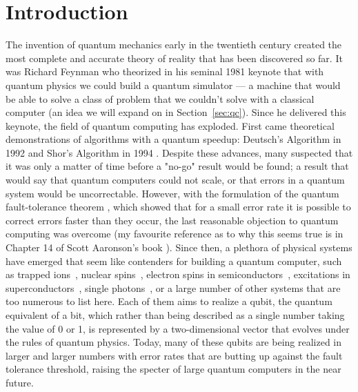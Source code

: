 \chapter{Introduction}

The invention of quantum mechanics early in the twentieth century created the most complete and accurate
theory of reality that has been discovered so far. It was Richard Feynman who theorized in his
seminal 1981 keynote \cite{Feynman1982} that with quantum physics we could build a quantum simulator ---
a machine that would be able to solve a class of problem that we couldn't solve with a
classical computer (an idea we will expand on in Section~\ref{sec:qc}). Since he delivered this keynote, the
field of quantum computing has exploded. First came theoretical demonstrations of algorithms
with a quantum speedup: Deutsch's Algorithm in 1992 \cite{Deutsch} and Shor's Algorithm in 1994 \cite{Shor}.
Despite these advances, many suspected that it was only a matter of time before a "no-go" result would
be found; a result that would say that quantum computers could not scale, or that errors in a quantum system would be uncorrectable.
However, with the formulation of the quantum fault-tolerance theorem \cite{1996quant.ph.11025A,doi:10.1098/rspa.1998.0167}, which
showed that for a small error rate it is possible to correct errors faster than they occur, the last
reasonable objection to quantum computing was overcome (my favourite reference as to why this seems true
is in Chapter 14 of Scott Aaronson's book \cite{Aaronson:skepticism}). Since then, a plethora of physical
systems have emerged that seem like contenders for building a quantum computer, such as trapped
ions~\cite{doi:10.1063/1.5088164}, nuclear spins~\cite{acs.nanolett.8b00006}, electron spins in
semiconductors~\cite{RevModPhys.79.1217}, excitations in superconductors~\cite{Wendin_2017},
single photons~\cite{OBrien1567}, or a large number of other systems that are too numerous to list here.
Each of them aims to realize a qubit, the quantum equivalent of a bit, which rather than being described
as a single number taking the value of 0 or 1, is represented by a two-dimensional vector that evolves under the rules
of quantum physics. Today, many of these qubits are being realized in larger and larger numbers with error rates
that are butting up against the fault tolerance threshold, raising the specter of large quantum computers
in the near future.

